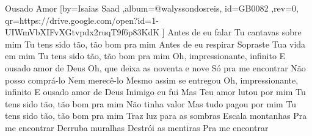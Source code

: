 \beginsong
{Ousado Amor %
}[by={Isaias Saad %
},album={@walyssondosreis},
id={GB0082 %
},rev={0}, %
qr={https://drive.google.com/open?id=1-UIWmVbXIFvXGtvpdx2ruqT9f6p83KdK %
}]
\beginverse*
Antes de eu falar
Tu cantavas sobre mim
Tu tens sido tão, tão bom pra mim
Antes de eu respirar
Sopraste Tua vida em mim
Tu tens sido tão, tão bom pra mim
\endverse
\beginchorus
Oh, impressionante, infinito
E ousado amor de Deus
Oh, que deixa as noventa e nove
Só pra me encontrar
Não posso comprá-lo
Nem merecê-lo
Mesmo assim se entregou
Oh, impressionante, infinito
E ousado amor de Deus
\endchorus
\beginverse*
Inimigo eu fui
Mas Teu amor lutou por mim
Tu tens sido tão, tão bom pra mim
Não tinha valor
Mas tudo pagou por mim
Tu tens sido tão, tão bom pra mim
\endverse
\beginverse*
Traz luz para as sombras
Escala montanhas
Pra me encontrar
Derruba muralhas
Destrói as mentiras
Pra me encontrar
\endverse

